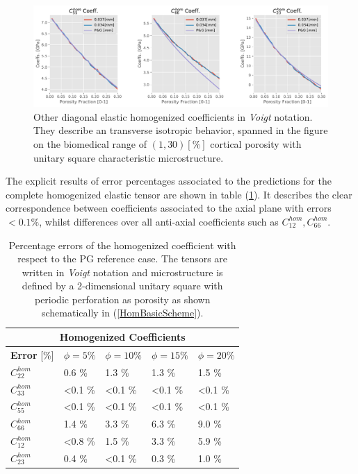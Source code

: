 \begin{figure}[!h]
	\centering
	\includegraphics[scale=.5]{images/CellsProb/CellProb_OthersHomCoeffsCircular.pdf}
	\caption{Other diagonal elastic homogenized coefficients in \textit{Voigt} notation. They describe an transverse isotropic behavior, spanned in the figure on the biomedical range of $(1,30) [\%]$ cortical porosity with unitary square characteristic microstructure.}
	\label{OtherHomCoeffsSquare}
\end{figure}

The explicit results of error percentages associated to the predictions for the complete homogenized elastic tensor are shown in table (\ref{HomCoeffSquareTable}).
It describes the clear correspondence between coefficients associated to the axial plane with errors $< 0.1\%$, whilst differences over all anti-axial coefficients such as $C_{12}^{hom}, C_{66}^{hom}$.
\begin{table}[!h]
\centering
    \begin{tabular}{ |p{2.2cm}||p{2cm}|p{2cm}|p{2cm}|p{2cm}| }
    \hline
    \multicolumn{5}{|c|}{\textbf{Homogenized Coefficients}} \\
    \hline
    \textbf{Error} [\%] & $\phi = 5 \%$ & $\phi = 10 \%$ & $\phi = 15 \%$ & $\phi = 20 \%$ \\
    \hline
    $C^{hom}_{22}$ & 0.6 \% & 1.3 \% & 1.3 \% & 1.5 \% \\
    $C^{hom}_{33}$ & <0.1 \% & <0.1 \% & <0.1 \% & <0.1 \% \\
    $C^{hom}_{55}$ & <0.1 \% & <0.1 \% & <0.1 \% & <0.1 \% \\
    $C^{hom}_{66}$ & 1.4 \% & 3.3 \% & 6.3 \% & 9.0 \% \\
    $C^{hom}_{12}$ & <0.8 \% & 1.5 \% & 3.3 \% & 5.9 \% \\
    $C^{hom}_{23}$ & 0.4 \% & <0.1 \% & 0.3 \% & 1.0 \% \\
    \hline
    \end{tabular}
    \caption{Percentage errors of the homogenized coefficient with respect to the PG reference case. The tensors are written in \textit{Voigt} notation and microstructure is defined by a 2-dimensional unitary square with periodic perforation as porosity as shown schematically in (\ref{HomBasicScheme}).}
    \label{HomCoeffSquareTable}
\end{table}

